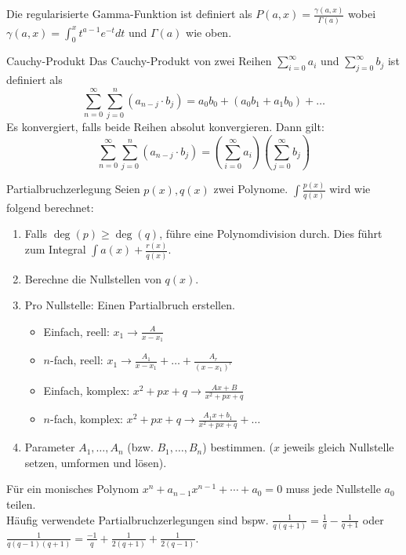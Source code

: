 \documentclass[a4paper,10pt]{article}
\begin{document}
Die regularisierte Gamma-Funktion ist definiert als $P(a, x) = \frac{\gamma(a, x)}{\Gamma(a)}$ wobei $\gamma(a, x) = \int_0^x t^{a - 1} e^{-t} dt$ und $\Gamma(a)$ wie oben.

\begin{mainbox}{Cauchy-Produkt}
	Das Cauchy-Produkt von zwei Reihen $\sum_{i = 0}^\infty a_i$ und $\sum_{j = 0}^\infty b_j$ ist definiert als
	$$\sum_{n=0}^\infty \sum_{j=0}^n (a_{n-j} \cdot b_j) = a_0b_0 + (a_0b_1 + a_1b_0) + \ldots$$ Es konvergiert, falls beide Reihen absolut konvergieren. Dann gilt:\\
	$$\sum_{n=0}^\infty \sum_{j=0}^n (a_{n-j} \cdot b_j) = \left( \sum_{i=0}^\infty a_i \right) \left( \sum_{j=0}^\infty b_j \right)$$
\end{mainbox}

\begin{mainbox}{Partialbruchzerlegung}
	Seien $p(x), q(x)$ zwei Polynome. $\int \frac{p(x)}{q(x)}$ wird wie folgend berechnet:
	\begin{enumerate}
		\item Falls $\deg(p) \ge \deg(q)$, führe eine Polynomdivision durch. Dies führt zum Integral $\int a(x) + \frac{r(x)}{q(x)}$.
		\item Berechne die Nullstellen von $q(x)$.
		\item Pro Nullstelle: Einen Partialbruch erstellen.
		      \begin{itemize}[left=0pt]
			      \item Einfach, reell: $x_1 \to \frac{A}{x - x_1}$
			      \item $n$-fach, reell: $x_1 \to \frac{A_1}{x - x_1} + \ldots + \frac{A_r}{(x-x_1)^r}$
			      \item Einfach, komplex: $x^2 + px + q \to \frac{Ax + B} {x^2 + px + q}$
			      \item $n$-fach, komplex: $x^2 + px + q \to \frac{A_1x+b_1}{x^2+px+q} + \ldots$
		      \end{itemize}
		\item Parameter $A_1, \ldots, A_n$ (bzw. $B_1, \ldots, B_n$) bestimmen. ($x$ jeweils gleich Nullstelle setzen, umformen und lösen).

	\end{enumerate}
\end{mainbox}

Für ein monisches Polynom $x^n + a_{n-1} x^{n-1} + \cdots + a_0 = 0$ muss jede Nullstelle $a_0$ teilen.\\

Häufig verwendete Partialbruchzerlegungen sind bspw. $\frac{1}{q(q+1)} = \frac{1}{q} - \frac{1}{q + 1}$ oder $\frac{1}{q(q-1)(q+1)} = \frac{-1}{q} + \frac{1}{2(q+1)} + \frac{1}{2(q-1)}$.
\end{document}

